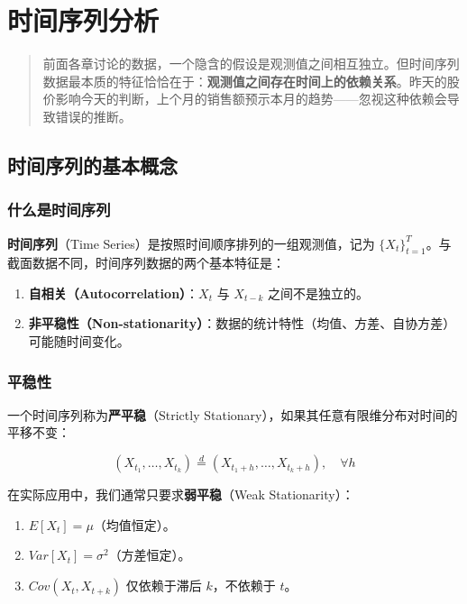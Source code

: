 \documentclass[
]{book}
\providecommand{\tightlist}{%
  \setlength{\itemsep}{0pt}\setlength{\parskip}{0pt}}
\begin{document}
\chapter{时间序列分析}\label{ux65f6ux95f4ux5e8fux5217ux5206ux6790}

\begin{quote}
前面各章讨论的数据，一个隐含的假设是观测值之间相互独立。但时间序列数据最本质的特征恰恰在于：\textbf{观测值之间存在时间上的依赖关系}。昨天的股价影响今天的判断，上个月的销售额预示本月的趋势------忽视这种依赖会导致错误的推断。
\end{quote}

\section{时间序列的基本概念}\label{ux65f6ux95f4ux5e8fux5217ux7684ux57faux672cux6982ux5ff5}

\subsection{什么是时间序列}\label{ux4ec0ux4e48ux662fux65f6ux95f4ux5e8fux5217}

\textbf{时间序列}（Time Series）是按照时间顺序排列的一组观测值，记为 \(\{X_t\}_{t=1}^T\)。与截面数据不同，时间序列数据的两个基本特征是：

\begin{enumerate}
\def\labelenumi{\arabic{enumi}.}
\tightlist
\item
  \textbf{自相关（Autocorrelation）}：\(X_t\) 与 \(X_{t-k}\) 之间不是独立的。
\item
  \textbf{非平稳性（Non-stationarity）}：数据的统计特性（均值、方差、自协方差）可能随时间变化。
\end{enumerate}

\subsection{平稳性}\label{ux5e73ux7a33ux6027}

一个时间序列称为\textbf{严平稳}（Strictly Stationary），如果其任意有限维分布对时间的平移不变：

\[(X_{t_1}, \ldots, X_{t_k}) \stackrel{d}{=} (X_{t_1+h}, \ldots, X_{t_k+h}), \quad \forall h\]

在实际应用中，我们通常只要求\textbf{弱平稳}（Weak Stationarity）：

\begin{enumerate}
\def\labelenumi{\arabic{enumi}.}
\tightlist
\item
  \(E[X_t] = \mu\)（均值恒定）。
\item
  \(Var[X_t] = \sigma^2\)（方差恒定）。
\item
  \(Cov(X_t, X_{t+k})\) 仅依赖于滞后 \(k\)，不依赖于 \(t\)。
\end{enumerate}
\end{document}
